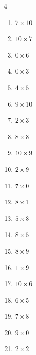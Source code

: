 \begin{multicols}{4}
\begin{enumerate}
  \item $7\times 10$
        \phantom{$=70$}

  \item $10\times 7$
        \phantom{$=70$}

  \item $0\times 6$
        \phantom{$=0$}

  \item $0\times 3$
        \phantom{$=0$}

  \item $4\times 5$
        \phantom{$=20$}

  \item $9\times 10$
        \phantom{$=90$}

  \item $2\times 3$
        \phantom{$=6$}

  \item $8\times 8$
        \phantom{$=64$}

  \item $10\times 9$
        \phantom{$=90$}

  \item $2\times 9$
        \phantom{$=18$}

  \item $7\times 0$
        \phantom{$=0$}

  \item $8\times 1$
        \phantom{$=8$}

  \item $5\times 8$
        \phantom{$=40$}

  \item $8\times 5$
        \phantom{$=40$}

  \item $8\times 9$
        \phantom{$=72$}

  \item $1\times 9$
        \phantom{$=9$}

  \item $10\times 6$
        \phantom{$=60$}

  \item $6\times 5$
        \phantom{$=30$}

  \item $7\times 8$
        \phantom{$=56$}

  \item $9\times 0$
        \phantom{$=0$}

  \item $2\times 2$
        \phantom{$=4$}


\end{enumerate}
\end{multicols}
